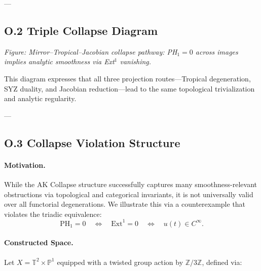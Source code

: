 \documentclass[11pt]{article}
\begin{document}
\begin{axiom}
\begin{axiom}
{{---

\subsection*{O.2 Triple Collapse Diagram}

\noindent
\begin{minipage}{\textwidth}
\centering
{}
\vspace{0.5em}

\small\textit{Figure: Mirror–Tropical–Jacobian collapse pathway: PH$_1 = 0$ across images implies analytic smoothness via Ext$^1$ vanishing.}
\end{minipage}

This diagram expresses that all three projection routes—Tropical degeneration, SYZ duality, and Jacobian reduction—lead to the same topological trivialization and analytic regularity.

---

\subsection*{O.3 Collapse Violation Structure}

\paragraph{Motivation.}
While the AK Collapse structure successfully captures many smoothness-relevant obstructions via topological and categorical invariants, it is not universally valid over all functorial degenerations. We illustrate this via a counterexample that violates the triadic equivalence:  
\[
\mathrm{PH}_1 = 0 \quad \Leftrightarrow \quad \mathrm{Ext}^1 = 0 \quad \Leftrightarrow \quad u(t) \in C^\infty.
\]

\paragraph{Constructed Space.}
Let \( X = \mathbb{T}^2 \times \mathbb{P}^1 \) equipped with a twisted group action by \( \mathbb{Z}/3\mathbb{Z} \), defined via:

}}
\end{axiom}
\end{axiom}
\end{document}
